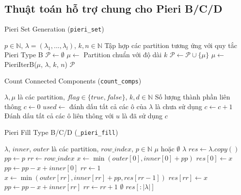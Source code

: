 
\subsection*{Thuật toán hỗ trợ chung cho Pieri B/C/D}

\begin{algorithm}[H]
\caption{Pieri Set Generation (\texttt{pieri\_set})}
\begin{algorithmic}[1]
\REQUIRE $p \in \mathbb{N}$, $\lambda = (\lambda_1, ..., \lambda_l)$, $k, n \in \mathbb{N}$
\ENSURE Tập hợp các partition tương ứng với quy tắc Pieri Type B
\STATE $\mathcal{P} \gets \emptyset$
\STATE $\mu \gets$ Partition chuẩn với độ dài $k$
\WHILE{$\mu \neq \emptyset$}
    \STATE $\mathcal{P} \gets \mathcal{P} \cup \{\mu\}$
    \STATE $\mu \gets$ PieriIterB($\mu$, $\lambda$, $k$, $n$)
\ENDWHILE
\RETURN $\mathcal{P}$
\end{algorithmic}
\end{algorithm}

\begin{algorithm}[H]
\caption{Count Connected Components (\texttt{count\_comps})}
\begin{algorithmic}[1]
\REQUIRE $\lambda, \mu$ là các partition, $flag \in \{true, false\}$, $k, d \in \mathbb{N}$
\ENSURE Số lượng thành phần liên thông
\STATE $c \gets 0$
\STATE $used \gets$ đánh dấu tất cả các ô của $\lambda$ là chưa sử dụng
        \STATE $c \gets c + 1$
        \STATE Đánh dấu tất cả các ô liên thông với $u$ là đã sử dụng
    \ENDIF
\ENDFOR
\RETURN $c$
\end{algorithmic}
\end{algorithm}

\begin{algorithm}[H]
\caption{Pieri Fill Type B/C/D (\texttt{\_pieri\_fill})}
\begin{algorithmic}[1]
\REQUIRE $\lambda$, $inner$, $outer$ là các partition, $row\_index$, $p \in \mathbb{N}$
\ENSURE $\mu$ hoặc $\emptyset$
\IF{$\lambda = \emptyset$}
    \RETURN $\lambda$
\ENDIF
\STATE $res \gets \lambda.copy()$
\STATE $pp \gets p$
\STATE $rr \gets row\_index$
    \STATE $x \gets \min(outer[0], inner[0] + pp)$
    \STATE $res[0] \gets x$
    \STATE $pp \gets pp - x + inner[0]$
    \STATE $rr \gets 1$
\ENDIF
{}
    \STATE $x \gets \min(outer[rr], inner[rr] + pp, res[rr-1])$
    \STATE $res[rr] \gets x$
    \STATE $pp \gets pp - x + inner[rr]$
    \STATE $rr \gets rr + 1$
\ENDWHILE
{}
    \RETURN $\emptyset$
\ENDIF
\RETURN $res[:|\lambda|]$
\end{algorithmic}
\end{algorithm}

